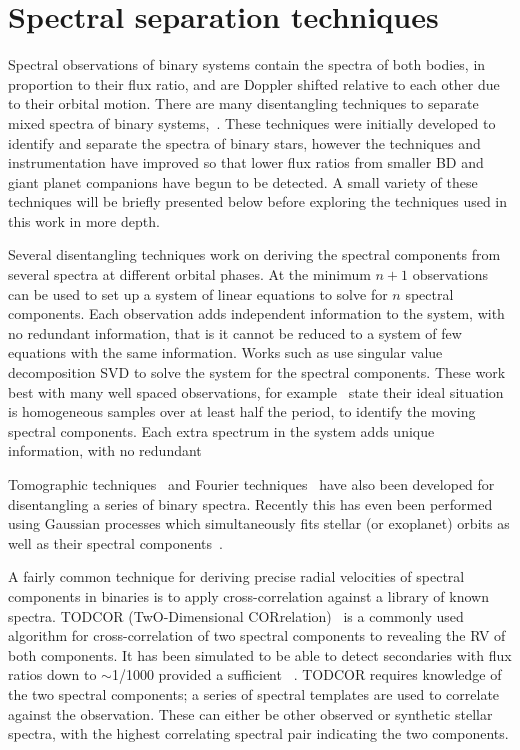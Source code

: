 
\section{Spectral separation techniques}
\label{sec:disentangling_techniques}

Spectral observations of binary systems contain the spectra of both bodies, in proportion to their flux ratio, and are Doppler shifted relative to each other due to their orbital motion.
There are many disentangling techniques to separate mixed spectra of binary systems,~\citep[e.g.][and references therein]{hadrava_disentangling_2009}.
These techniques were initially developed to identify and separate the spectra of binary stars, however the techniques and instrumentation have improved so that lower flux ratios from smaller BD and giant planet companions have begun to be detected.
A small variety of these techniques will be briefly presented below before exploring the techniques used in this work in more depth.

Several disentangling techniques work on deriving the spectral components from several spectra at different orbital phases.
At the minimum \(n+1\) observations can be used to set up a system of linear equations to solve for \(n\) spectral components.
Each observation adds independent information to the system, with no redundant information, that is it cannot be reduced to a system of few equations with the same information.
Works such as \citet[][]{simon_disentangling_1994, sablowski_spectral_2016} use singular value decomposition {SVD} to solve the system for the spectral components.
These work best with many well spaced observations, for example~\citet{sablowski_spectral_2016} state their ideal situation is homogeneous samples over at least half the period, to identify the moving spectral components.
Each extra spectrum in the system adds unique information, with no redundant  

Tomographic techniques~\citep[e.g.][]{bagnuolo_tomographic_1991} and Fourier techniques~\citep{hadrava_orbital_1995} have also been developed for disentangling a series of binary spectra.
Recently this has even been performed using Gaussian processes which simultaneously fits stellar (or exoplanet) orbits as well as their spectral components~\citep{czekala_disentangling_2017}.

A fairly common technique for deriving precise radial velocities of spectral components in binaries is to apply cross-correlation against a library of known spectra.
{TODCOR} (TwO-Dimensional CORrelation)~\citep{zucker_study_1994} is a commonly used algorithm for cross-correlation of two spectral components to revealing the {RV} of both components.
It has been simulated to be able to detect secondaries with flux ratios down to \(\sim\)1/1000 provided a sufficient \snr{}~\citep[e.g.][]{mazeh_todcor_1994,mazeh_detecting_1997}.
{TODCOR} requires knowledge of the two spectral components; a series of spectral templates are used to correlate against the observation.
These can either be other observed or synthetic stellar spectra, with the highest correlating spectral pair indicating the two components.

